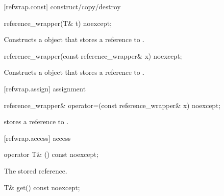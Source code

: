 [refwrap.const]{ construct/copy/destroy}

%
\begin{itemdecl}
reference_wrapper(T& t) noexcept;
\end{itemdecl}

\begin{itemdescr}
\pnum
\effects Constructs a  object that stores a
reference to .
\end{itemdescr}

%
\begin{itemdecl}
reference_wrapper(const reference_wrapper& x) noexcept;
\end{itemdecl}

\begin{itemdescr}
\pnum\effects Constructs a  object that
stores a reference to .
\end{itemdescr}

[refwrap.assign]{ assignment}

\begin{itemdecl}
reference_wrapper& operator=(const reference_wrapper& x) noexcept;
\end{itemdecl}

\begin{itemdescr}
\pnum\postconditions {} stores a reference to  .
\end{itemdescr}

[refwrap.access]{ access}

\begin{itemdecl}
operator T& () const noexcept;
\end{itemdecl}

\begin{itemdescr}
\pnum\returns The stored reference.
\end{itemdescr}

%
%
\begin{itemdecl}
T& get() const noexcept;
\end{itemdecl}

